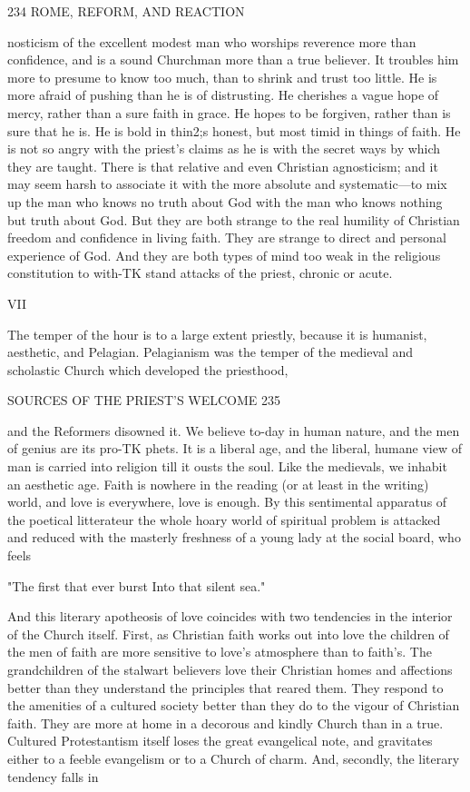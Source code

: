 \documentclass[12pt,a5paper,oneside]{book}
\begin{document}
{234 ROME, REFORM, AND REACTION 

nosticism of the excellent modest man who worships 
reverence more than confidence, and is a sound 
Churchman more than a true believer. It troubles him 
more to presume to know too much, than to shrink and 
trust too little. He is more afraid of pushing than he 
is of distrusting. He cherishes a vague hope of mercy, 
rather than a sure faith in grace. He hopes to be 
forgiven, rather than is sure that he is. He is bold in 
thin2;s honest, but most timid in things of faith. He 
is not so angry with the priest's claims as he is with 
the secret ways by which they are taught. There 
is that relative and even Christian agnosticism; and it 
may seem harsh to associate it with the more absolute 
and systematic---to mix up the man who knows no 
truth about God with the man who knows nothing but 
truth about God. But they are both strange to the 
real humility of Christian freedom and confidence in 
living faith. They are strange to direct and personal 
experience of God. And they are both types of 
mind too weak in the religious constitution to with-TK
stand attacks of the priest, chronic or acute. 

VII 

The temper of the hour is to a large extent priestly, 
because it is humanist, aesthetic, and Pelagian. 
Pelagianism was the temper of the medieval and 
scholastic Church which developed the priesthood, 



SOURCES OF THE PRIEST'S WELCOME 235 

and the Reformers disowned it. We believe to-day 
in human nature, and the men of genius are its pro-TK
phets. It is a liberal age, and the liberal, humane 
view of man is carried into religion till it ousts the 
soul. Like the medievals, we inhabit an aesthetic 
age. Faith is nowhere in the reading (or at least in 
the writing) world, and love is everywhere, love is 
enough. By this sentimental apparatus of the poetical 
litterateur the whole hoary world of spiritual problem 
is attacked and reduced with the masterly freshness 
of a young lady at the social board, who feels 

"The first that ever burst 
Into that silent sea." 

And this literary apotheosis of love coincides with two 
tendencies in the interior of the Church itself. First, 
as Christian faith works out into love the children of the 
men of faith are more sensitive to love's atmosphere 
than to faith's. The grandchildren of the stalwart 
believers love their Christian homes and affections 
better than they understand the principles that reared 
them. They respond to the amenities of a cultured 
society better than they do to the vigour of Christian 
faith. They are more at home in a decorous and 
kindly Church than in a true. Cultured Protestantism 
itself loses the great evangelical note, and gravitates 
either to a feeble evangelism or to a Church of 
charm. And, secondly, the literary tendency falls in 



}
\end{document}
